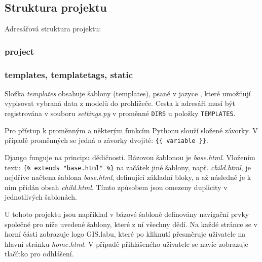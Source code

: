 \subsection{Struktura projektu}
Adresářová struktura projektu:


\subsubsection{project}

\subsubsection{templates, templatetags, static}
Složka \textit{templates} obsahuje šablony (templates), psané v jazyce , které umožňují vypisovat vybraná data z modelů do prohlížeče. Cesta k adresáři musí být registrována v souboru \textit{settings.py} v proměnné \texttt{DIRS} u položky \texttt{TEMPLATES}.

Pro přístup k proměnným a některým funkcím Pythonu slouží složené závorky. V případě proměnných se jedná o závorky dvojité: \texttt{\{\{ variable \}\}}. 

Django funguje na principu dědičnosti. Bázovou šablonou je \textit{base.html}. Vložením textu \texttt{\{\% extends "base.html" \%\}} na začátek jiné šablony, např. \textit{child.html}, je nejdříve načtena šablona \textit{base.html}, definující základní bloky, a až následně je k nim přidán obsah \textit{child.html}. Tímto způsobem jsou omezeny duplicity v jednotlivých šablonách.

U tohoto projektu jsou například v bázové šabloně definovány navigační prvky společné pro níže uvedené šablony, které z ní všechny dědí. Na každé stránce se v horní části zobrazuje logo GIS.labu, které po kliknutí přesměruje uživatele na hlavní stránku \textit{home.html}. V případě přihlášeného uživatele se navíc zobrazuje tlačítko pro odhlášení.

